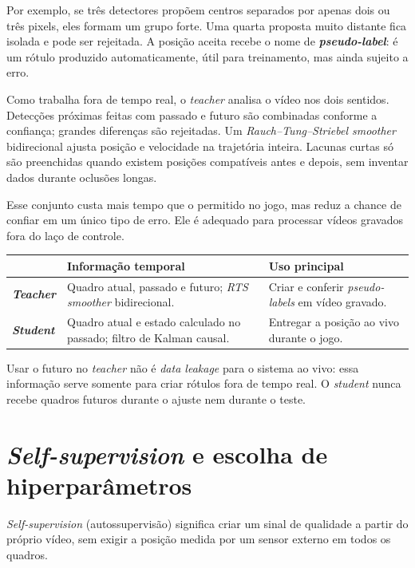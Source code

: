 \documentclass[11pt,a4paper]{article}
\begin{document}
Por exemplo, se três detectores propõem centros separados por apenas dois ou três pixels,
eles formam um grupo forte. Uma quarta proposta muito distante fica isolada e pode ser
rejeitada. A posição aceita recebe o nome de \textbf{\textit{pseudo-label}}: é um rótulo produzido
automaticamente, útil para treinamento, mas ainda sujeito a erro.

Como trabalha fora de tempo real, o \textit{teacher} analisa o vídeo nos dois sentidos. Detecções
próximas feitas com passado e futuro são combinadas conforme a confiança; grandes diferenças
são rejeitadas. Um \textit{Rauch--Tung--Striebel smoother} bidirecional ajusta posição e
velocidade na trajetória inteira. Lacunas curtas só são preenchidas quando existem posições
compatíveis antes e depois, sem inventar dados durante oclusões longas.

Esse conjunto custa mais tempo que o permitido no jogo, mas reduz a chance de confiar em um
único tipo de erro. Ele é adequado para processar vídeos gravados fora do laço de controle.

\begin{center}
\begin{tabularx}{\linewidth}{>{\bfseries}p{2.4cm}XX}
\toprule
 & Informação temporal & Uso principal\\
\midrule
\textit{Teacher} & Quadro atual, passado e futuro; \textit{RTS smoother} bidirecional. & Criar e conferir
\textit{pseudo-labels} em vídeo gravado.\\
\textit{Student} & Quadro atual e estado calculado no passado; filtro de Kalman causal. & Entregar a
posição ao vivo durante o jogo.\\
\bottomrule
\end{tabularx}
\end{center}

Usar o futuro no \textit{teacher} não é \textit{data leakage} para o sistema ao vivo: essa
informação serve somente para criar rótulos fora de tempo real. O \textit{student} nunca
recebe quadros futuros durante
o ajuste nem durante o teste.

\section{\textit{Self-supervision} e escolha de hiperparâmetros}

\textit{Self-supervision} (autossupervisão) significa criar um sinal de qualidade a partir do próprio vídeo, sem exigir
a posição medida por um sensor externo em todos os quadros.
\end{document}
